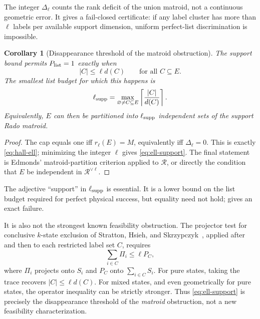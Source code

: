 \documentclass[11pt]{article}
\newtheorem{corollary}[theorem]{Corollary}
\theoremstyle{definition}
\theoremstyle{remark}
\newcommand{\cR}{\mathcal R}
\begin{document}
The integer $\Delta_\ell$ counts the rank deficit of the union matroid, not a
continuous geometric error.  It gives a fail-closed certificate: if any
label cluster has more than $\ell$ labels per available support dimension,
uniform perfect-list discrimination is impossible.

\begin{corollary}[Disappearance threshold of the matroid obstruction]\label{cor:threshold}
The support bound permits $P_{\rm list}=1$ exactly when
\begin{equation}\label{eq:hall-ell}
 |C|\leq\ell d(C)\qquad\text{for all }C\subseteq E.
\end{equation}
The smallest list budget for which this happens is
\begin{equation}\label{eq:ell-support}
 \ell_{\rm supp}
 =\max_{\varnothing\ne C\subseteq E}
   \left\lceil\frac{|C|}{d(C)}\right\rceil.
\end{equation}
Equivalently, $E$ can then be partitioned into $\ell_{\rm supp}$ independent
sets of the support Rado matroid.
\end{corollary}

\begin{proof}
The cap equals one iff $r_\ell(E)=M$, equivalently iff
$\Delta_\ell=0$.  This is exactly \eqref{eq:hall-ell}; minimizing the integer
$\ell$ gives \eqref{eq:ell-support}.  The final statement is Edmonds'
matroid-partition criterion applied to $\cR$, or directly the condition that
$E$ be independent in $\cR^{\vee\ell}$.
\end{proof}

The adjective ``support'' in $\ell_{\rm supp}$ is essential.  It is a lower
bound on the list budget required for perfect physical success, but equality
need not hold;  gives an exact failure.

It is also not the strongest known feasibility obstruction.  The projector
test for conclusive $k$-state exclusion of Stratton, Hsieh, and
Skrzypczyk~\cite{stratton2024}, applied after  and then to
each restricted label set $C$, requires
\begin{equation}\label{eq:projector-test}
 \sum_{i\in C}\Pi_i\leq\ell P_C,
\end{equation}
where $\Pi_i$ projects onto $S_i$ and $P_C$ onto
$\sum_{i\in C}S_i$.  For pure states, taking the trace recovers
$|C|\leq\ell d(C)$.  For mixed states, and even geometrically for pure states,
the operator inequality can be strictly stronger.  Thus
\eqref{eq:ell-support} is precisely the disappearance threshold of the
\emph{matroid} obstruction, not a new feasibility characterization.
\end{document}
